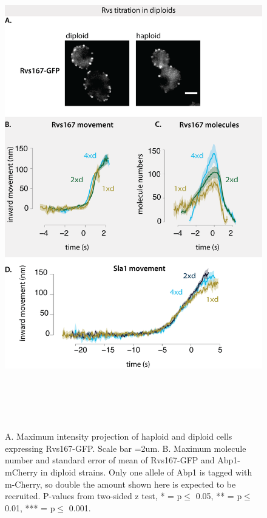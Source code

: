 \vspace{2mm}
						\begin{figure}[H]
	\centering
\includegraphics[width=21cm,height=21cm,keepaspectratio]{figures/results_final/protein_friction7}
	\vspace*{2mm}
	\caption[Molecule numbers in diploid cells]
	{A. Maximum intensity projection of haploid and diploid cells expressing Rvs167-GFP. Scale bar =2um.      
		B. Maximum molecule number and standard error of mean of Rvs167-GFP and Abp1-mCherry in diploid strains. Only one allele of Abp1 is tagged with m-Cherry, so double the amount shown here is expected to be recruited. P-values from two-sided z test,  * = p$\leq$ 0.05, ** = p$\leq$ 0.01, *** = p$\leq$ 0.001. 
		\label{fig_rvsdiploid1}}
\end{figure}








